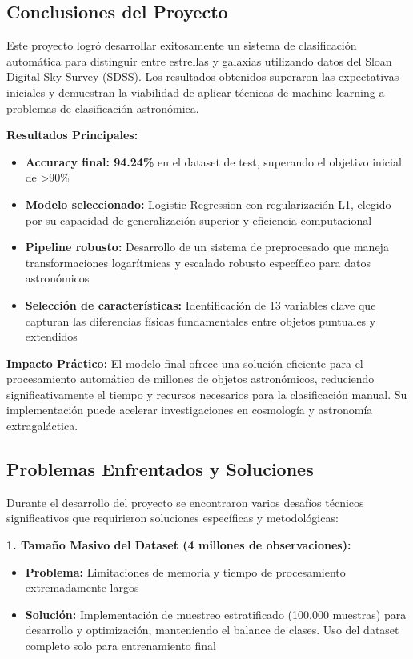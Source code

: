 \documentclass{article}
\begin{document}
\subsection{Conclusiones del Proyecto}

Este proyecto logró desarrollar exitosamente un sistema de clasificación automática para distinguir entre estrellas y galaxias utilizando datos del Sloan Digital Sky Survey (SDSS). Los resultados obtenidos superaron las expectativas iniciales y demuestran la viabilidad de aplicar técnicas de machine learning a problemas de clasificación astronómica.

\textbf{Resultados Principales:}
\begin{itemize}
    \item \textbf{Accuracy final: 94.24\%} en el dataset de test, superando el objetivo inicial de >90\%
    \item \textbf{Modelo seleccionado:} Logistic Regression con regularización L1, elegido por su capacidad de generalización superior y eficiencia computacional
    \item \textbf{Pipeline robusto:} Desarrollo de un sistema de preprocesado que maneja transformaciones logarítmicas y escalado robusto específico para datos astronómicos
    \item \textbf{Selección de características:} Identificación de 13 variables clave que capturan las diferencias físicas fundamentales entre objetos puntuales y extendidos
\end{itemize}

\textbf{Impacto Práctico:}
El modelo final ofrece una solución eficiente para el procesamiento automático de millones de objetos astronómicos, reduciendo significativamente el tiempo y recursos necesarios para la clasificación manual. Su implementación puede acelerar investigaciones en cosmología y astronomía extragaláctica.

\subsection{Problemas Enfrentados y Soluciones}

Durante el desarrollo del proyecto se encontraron varios desafíos técnicos significativos que requirieron soluciones específicas y metodológicas:

\textbf{1. Tamaño Masivo del Dataset (4 millones de observaciones):}
\begin{itemize}
    \item \textbf{Problema:} Limitaciones de memoria y tiempo de procesamiento extremadamente largos
    \item \textbf{Solución:} Implementación de muestreo estratificado (100,000 muestras) para desarrollo y optimización, manteniendo el balance de clases. Uso del dataset completo solo para entrenamiento final
\end{itemize}
\end{document}
